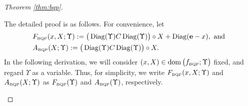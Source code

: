 \documentclass[smallextended]{svjour3hack}       %
\DeclareMathOperator{\Diag}{Diag}
\DeclareMathOperator{\dom}{dom}
\begin{document}
\begin{proof}[Theorem \ref{thm:bqp}]
\begin{itemize}



    The detailed proof is as follows. For convenience, let
    \begin{align*}
    &F_{{\tiny\mbox{BQP}}}(x,X;\Upsilon):= \left(\strut\Diag(\Upsilon)C\Diag(\Upsilon)\right)\circ X+ \Diag(\mathbf{e}-x), \mbox{ and }\\
    &A_{{\tiny\mbox{BQP}}}(X;\Upsilon):=\left(\strut\Diag(\Upsilon)C\Diag(\Upsilon)\right)\circ X.
    \end{align*}
    In the following derivation, we will consider $(x,X)\in \dom\left(\strut f_{{\tiny\mbox{BQP}}};\Upsilon\right)$ fixed, and regard $\Upsilon$ as a variable. Thus, for simplicity, we  write $F_{{\tiny\mbox{BQP}}}(x,X;\Upsilon)$ and  $A_{{\tiny\mbox{BQP}}}(X;\Upsilon)$ as $F_{{\tiny\mbox{BQP}}}(\Upsilon)$ and $A_{{\tiny\mbox{BQP}}}(\Upsilon)$, respectively.


\end{itemize}
\end{proof}
\end{document}
